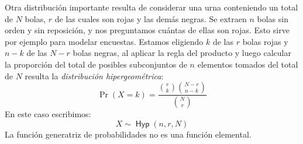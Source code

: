   Otra distribución importante resulta de considerar una urna
  conteniendo un total de \(N\) bolas,
  \(r\) de las cuales son rojas
  y las demás negras.
  Se extraen \(n\) bolas sin orden y sin reposición,
  y nos preguntamos cuántas de ellas son rojas.
  Esto sirve por ejemplo para modelar encuestas.
  Estamos eligiendo \(k\) de las \(r\) bolas rojas
  y \(n - k\) de las \(N - r\) bolas negras,
  al aplicar la regla del producto
  y luego calcular la proporción del total de posibles subconjuntos
  de \(n\) elementos tomados del total de \(N\)
  resulta la \emph{distribución hipergeométrica}:%
  \begin{equation}
    \label{eq:Hyp-distribution}
    \Pr(X = k)
      = \frac{\binom{r}{k} \binom{N - r}{n - k}}{\binom{N}{r}}
  \end{equation}
  En este caso escribimos:
  \begin{equation}
    \label{eq:distributed-Hyp}
    X \sim \operatorname{\boldsymbol{\mathsf{Hyp}}}(n, r, N)
  \end{equation}
  La función generatriz de probabilidades
  no es una función elemental.

